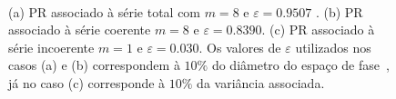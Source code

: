 \begin{figure}[ht]
\centering 
{}  \\   
\caption{(a) PR associado à série total com $m=8$ e $\varepsilon=0.9507$ . (b) PR associado à série coerente $m=8$ e $\varepsilon=0.8390$. (c) PR associado à série incoerente $m=1$ e $\varepsilon=0.030$. Os valores de $\varepsilon$ utilizados nos casos (a) e (b) correspondem à $10\%$ do diâmetro do espaço de fase~\cite{thielromano/04}, já no caso (c) corresponde à $10\%$ da variância associada.}
\label{figrptemps}
\end{figure}


